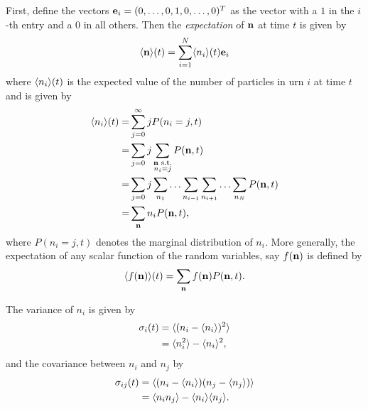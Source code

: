 First, define the vectors \(\mathbf{e}_i = (0,\dotsc,0,1,0,\dotsc,0)^T\) as the
vector with a \(1\) in the \(i\)-th entry and a \(0\) in all others. Then the
\emph{expectation} of \(\mathbf{n}\) at time \(t\) is given by
\begin{equation}
    \langle \mathbf{n} \rangle(t) = \sum_{i=1}^N \langle n_i \rangle(t) \mathbf{e}_i
    \label{eqn:expectation_n}
\end{equation}
where \(\langle n_i \rangle(t)\) is the expected value of the number of particles in urn
\(i\) at time \(t\) and is given by
\begin{equation}
    \begin{aligned}
        \langle n_i \rangle(t) =& \sum_{j=0}^\infty j P(n_i = j,t)\\
        =& \sum_{j=0} j
        \sum_{\substack{\mathbf{n} \text{ s.t.} \\ n_i=j}} P(\mathbf{n},t)\\
        =& \sum_{j=0} j
        \sum_{n_1} \dotso \sum_{n_{i-1}} \sum_{n_{i+1}} \dotso \sum_{n_N} P(\mathbf{n},t)\\
        =& \sum_{\mathbf{n}} n_i P(\mathbf{n},t),
    \end{aligned}
    \label{eqn:expecation_n_i}
\end{equation}
where \(P(n_i = j,t)\) denotes the marginal distribution of \(n_i\).  More
generally, the expectation of any scalar function of the random variables, say
\(f(\mathbf{n})\) is defined by
\begin{equation}
    \langle f(\mathbf{n}) \rangle(t) = \sum_{\mathbf{n}} f(\mathbf{n}) P(\mathbf{n},t).
    \label{eqn:expectation_f(n)}
\end{equation}

The variance of \(n_i\) is given by
\begin{equation}
    \begin{aligned}
        \sigma_i(t) &= \langle (n_i - \langle n_i \rangle)^2 \rangle\\
        &= \langle n_i^2 \rangle - \langle n_i \rangle^2,
    \end{aligned}
    \label{eqn:variance_n_i}
\end{equation}
and the covariance between \(n_i\) and \(n_j\) by
\begin{equation}
    \begin{aligned}
        \sigma_{ij}(t) &= \langle (n_i - \langle n_i \rangle)(n_j - \langle n_j \rangle) \rangle\\
        &= \langle n_i n_j \rangle - \langle n_i \rangle \langle n_j \rangle.
    \end{aligned}
    \label{eqn:covariance_n_i_n_j}
\end{equation}

